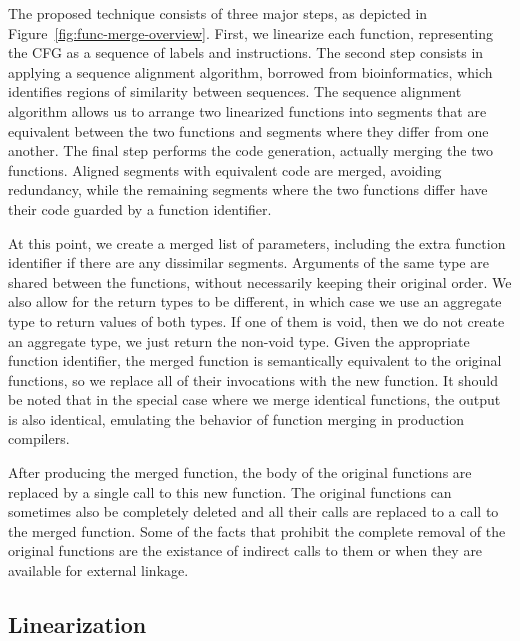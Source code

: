 The proposed technique consists of three major steps, as depicted in
Figure~\ref{fig:func-merge-overview}.
First, we linearize each function, representing the CFG as a sequence of
labels and instructions.
The second step consists in applying a sequence alignment algorithm, borrowed
from bioinformatics, which identifies regions of similarity between sequences.
The sequence alignment algorithm allows us to arrange two linearized functions
into segments that are equivalent between the two functions and segments where
they differ from one another.
The final step performs the code generation, actually merging the two functions.
Aligned segments with equivalent code are merged, avoiding redundancy, %
while the remaining segments where the two functions differ have their code guarded by a function identifier.

At this point, we create a merged list of parameters, including the extra function identifier if there are any
dissimilar segments. 
Arguments of the same type are shared between the functions, without necessarily keeping their original
order.
We also allow for the return types to be different, in which case we use an aggregate type to return values of both types.
If one of them is void, then we do not create an aggregate type, we just return the non-void type.
Given the appropriate function identifier, the merged function is semantically equivalent to the original functions,
so we replace all of their invocations with the new function.
It should be noted that in the special case where we merge identical functions, the output is also identical, emulating
the behavior of function merging in production compilers.

After producing the merged function, the body of the original functions are
replaced by a single call to this new function.
The original functions can sometimes also be completely deleted and all their
calls are replaced to a call to the merged function.
Some of the facts that prohibit the complete removal of the original functions
are the existance of indirect calls to them or when they are available for
external linkage.
 
\subsection{Linearization}

